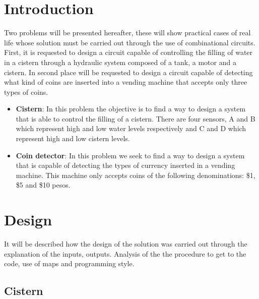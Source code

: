 \documentclass{article}
\begin{document}
\begin{multicols}{2} %
\section*{Introduction}\label{seccion}  
Two problems will be presented hereafter, these will show practical cases of real life whose solution must be carried out through the use of combinational circuits. First, it is requested to design a circuit capable of controlling the filling of water in a cistern  through a hydraulic system composed of a tank, a motor and a cistern. In second place will be requested to design a circuit capable of detecting what kind of coins are inserted into a vending machine that accepts only three types of coins.
\begin{itemize}
    \item \textbf{Cistern}: In this problem the objective is to find a way to design a system that is able to control the filling of a cistern. There are four sensors, A and B which represent high and low water levels respectively and C and D which represent high and low cistern levels.
    \item \textbf{Coin detector}: In this problem we seek to find a way to design a system that is capable of detecting the types of currency inserted in a vending machine. This machine only accepts coins of the following denominations: \$1, \$5 and \$10 pesos.
\end{itemize}

\section*{Design}
It will be described how the design of the solution was carried out through the explanation of the inputs, outputs. Analysis of the the procedure to get to the code, use of maps and programming style.
\subsection*{Cistern}


\end{multicols}
\end{document}
